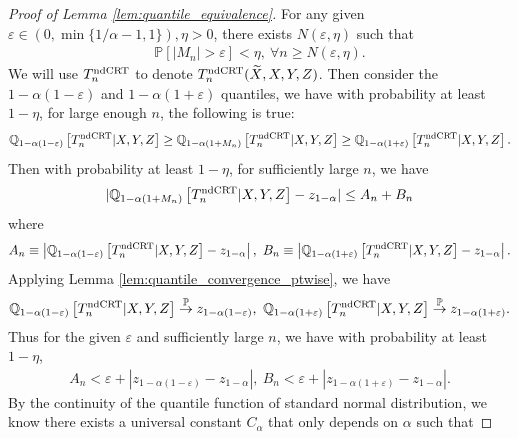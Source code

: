 \documentclass[12pt]{article}
\theoremstyle{definition}
\def\P{\mathbb{P}}
\def\P{\mathbb{P}}
\renewcommand{\P}{\mathbb{P}}							%
\newcommand{\Q}{\mathbb{Q}}								%
\newcommand{\convp}{\overset{\mathbb{P}}{\rightarrow}}             %
\newcommand{\srx}{X}									%
\newcommand{\srz}{Z}									%
\newcommand{\srxk}{\widetilde X}						%
\newcommand{\sry}{Y}									%
\newcommand{\ndCRThat}{\textnormal{ndCRT}}	%
\begin{document}
  \begin{proof}[Proof of Lemma \ref{lem:quantile_equivalence}]
    For any given $\varepsilon\in (0,\min\{1/\alpha-1,1\}),\eta>0$, there exists $N(\varepsilon,\eta)$ such that 
    \begin{align*}
      \P[|M_n|>\varepsilon]<\eta,\ \forall n\geq N(\varepsilon,\eta).
    \end{align*}
    We will use $T_n^{\ndCRThat}$ to denote $T_n^{\ndCRThat}(\srxk,\srx,\sry,\srz)$. Then consider the $1-\alpha(1-\varepsilon)$ and $1-\alpha(1+\varepsilon)$ quantiles, we have with probability at least $1-\eta$, for large enough $n$, the following is true:
    \begin{align*}
      \Q_{1-\alpha(1-\varepsilon)}\left[T_n^{\ndCRThat}|\srx,\sry,\srz\right]\geq \Q_{1-\alpha(1+M_n)}\left[T_n^{\ndCRThat}|\srx,\sry,\srz\right]\geq \Q_{1-\alpha(1+\varepsilon)}\left[T_n^{\ndCRThat}|\srx,\sry,\srz\right].
    \end{align*}
    Then with probability at least $1-\eta$, for sufficiently large $n$, we have
    \begin{align}\label{eq:quantile_upper_bound}
      |\Q_{1-\alpha(1+M_n)}\left[T_n^{\ndCRThat}|\srx,\sry,\srz\right] - z_{1-\alpha}|\leq A_n + B_n
    \end{align}
    where 
    \begin{align*}
      A_n\equiv \left|\Q_{1-\alpha(1-\varepsilon)}\left[T_n^{\ndCRThat}|\srx,\sry,\srz\right]- z_{1-\alpha}\right|,\ B_n\equiv \left|\Q_{1-\alpha(1+\varepsilon)}\left[T_n^{\ndCRThat}|\srx,\sry,\srz\right]- z_{1-\alpha}\right|.
    \end{align*}
    Applying Lemma \ref{lem:quantile_convergence_ptwise}, we have 
    \begin{align*}
      \Q_{1-\alpha(1-\varepsilon)}\left[T_n^{\ndCRThat}|\srx,\sry,\srz\right]\convp z_{1-\alpha(1-\varepsilon)},\ \Q_{1-\alpha(1+\varepsilon)}\left[T_n^{\ndCRThat}|\srx,\sry,\srz\right]\convp z_{1-\alpha(1+\varepsilon)}.
    \end{align*}
    Thus for the given $\varepsilon$ and sufficiently large $n$, we have with probability at least $1-\eta$,
    \begin{align*}
      A_n< \varepsilon+|z_{1-\alpha(1-\varepsilon)}-z_{1-\alpha}|,\ B_n< \varepsilon+|z_{1-\alpha(1+\varepsilon)}-z_{1-\alpha}|.
    \end{align*}
    By the continuity of the quantile function of standard normal distribution, we know there exists a universal constant $C_\alpha$ that only depends on $\alpha$ such that 

\end{proof}
\end{document}
